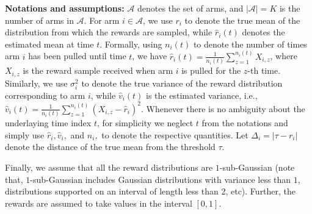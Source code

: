 \textbf{Notations and assumptions:} $\mathcal{A}$ denotes the set of arms, and $|\mathcal{A}|=K$ is the number of arms in $\mathcal{A}$. 
For arm $i\in\mathcal{A}$, we use $r_{i}$ to denote the true mean of the distribution from which the rewards are sampled, while $\hat{r}_{i}(t)$ denotes the estimated mean at time $t$. Formally, using $n_i(t)$ to denote the number of times arm $i$ has been pulled until time $t$, we have $\hat{r}_{i}(t)=\frac{1}{n_{i}(t)}\sum_{z=1}^{n_i(t)} X_{i,z}$, where $X_{i,z}$ is the reward sample received when arm $i$ is pulled for the $z$-th time. %
Similarly, we use $\sigma_{i}^{2}$ to denote the true variance of the reward distribution corresponding to arm $i$, while $\hat{v}_{i}(t)$ is the estimated variance, i.e., $\hat{v}_{i}(t)=\frac{1}{n_i(t)}\sum_{z=1}^{n_{i}(t)}(X_{i,z}-\hat{r}_{i})^{2}$. Whenever there is no ambiguity about the underlaying  time index $t$, for simplicity we neglect $t$ from the notations and simply use  $\hat{r}_i, \hat{v}_i,$ and $n_i, $ to denote the respective quantities.  Let  $\Delta_{i}=|\tau-r_{i}|$ denote the distance of the true mean from the threshold $\tau$.




 
Finally, we assume that all the reward distributions 
are $1$-sub-Gaussian (note that,  $1$-sub-Gaussian includes Gaussian distributions with variance less than $1$, distributions supported on an interval of length less than 2, etc). Further, the rewards are assumed to take values in the interval $[0,1]$.

